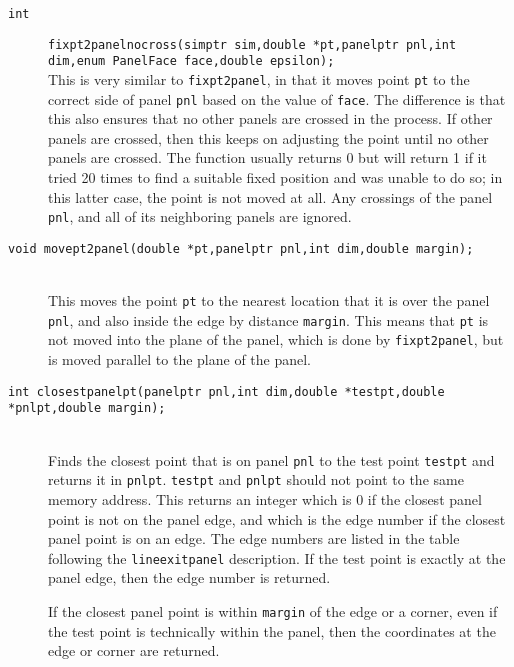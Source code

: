 \documentclass {book}
\begin{document}
\begin{description}
\item[\texttt{int}]
\texttt{fixpt2panelnocross(simptr sim,double *pt,panelptr pnl,int dim,enum PanelFace face,double epsilon);}
\hfill \\
This is very similar to \texttt{fixpt2panel}, in that it moves point \texttt{pt} to the correct side of panel \texttt{pnl} based on the value of \texttt{face}. The difference is that this also ensures that no other panels are crossed in the process. If other panels are crossed, then this keeps on adjusting the point until no other panels are crossed. The function usually returns 0 but will return 1 if it tried 20 times to find a suitable fixed position and was unable to do so; in this latter case, the point is not moved at all. Any crossings of the panel \texttt{pnl}, and all of its neighboring panels are ignored.

\item[\texttt{void movept2panel(double *pt,panelptr pnl,int dim,double margin);}]
\hfill \\
This moves the point \texttt{pt} to the nearest location that it is over the panel \texttt{pnl}, and also inside the edge by distance \texttt{margin}. This means that \texttt{pt} is not moved into the plane of the panel, which is done by \texttt{fixpt2panel}, but is moved parallel to the plane of the panel.

\item[\texttt{int closestpanelpt(panelptr pnl,int dim,double *testpt,double *pnlpt,double margin);}]
\hfill \\
Finds the closest point that is on panel \texttt{pnl} to the test point \texttt{testpt} and returns it in \texttt{pnlpt}. \texttt{testpt} and \texttt{pnlpt} should not point to the same memory address. This returns an integer which is 0 if the closest panel point is not on the panel edge, and which is the edge number if the closest panel point is on an edge. The edge numbers are listed in the table following the \texttt{lineexitpanel} description. If the test point is exactly at the panel edge, then the edge number is returned.

If the closest panel point is within \texttt{margin} of the edge or a corner, even if the test point is technically within the panel, then the coordinates at the edge or corner are returned.


\end{description}
\end{document}
